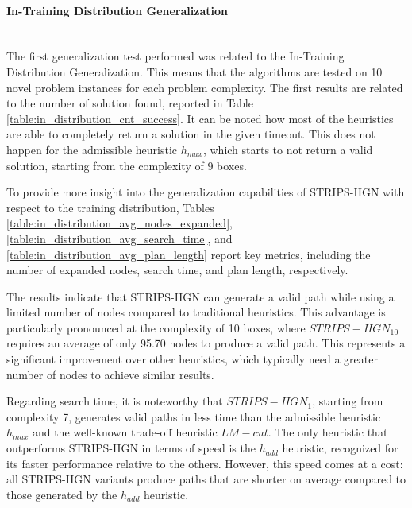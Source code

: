 \paragraph*{In-Training Distribution Generalization}\mbox{}\\
The first generalization test performed was related to the In-Training Distribution Generalization. This means that the algorithms are tested on 10 novel problem instances for each problem complexity.
The first results are related to the number of solution found, reported in Table \ref{table:in_distribution_cnt_success}. It can be noted how most of the heuristics are able to completely return a solution in the given timeout. This does not happen for the admissible heuristic $h_{max}$, which starts to not return a valid solution, starting from the complexity of 9 boxes. 



To provide more insight into the generalization capabilities of STRIPS-HGN with respect to the training distribution, Tables \ref{table:in_distribution_avg_nodes_expanded}, \ref{table:in_distribution_avg_search_time}, and \ref{table:in_distribution_avg_plan_length} report key metrics, including the number of expanded nodes, search time, and plan length, respectively.





The results indicate that STRIPS-HGN can generate a valid path while using a limited number of nodes compared to traditional heuristics. This advantage is particularly pronounced at the complexity of 10 boxes, where $STRIPS-HGN_{10}$ requires an average of only 95.70 nodes to produce a valid path. This represents a significant improvement over other heuristics, which typically need a greater number of nodes to achieve similar results.

Regarding search time, it is noteworthy that $STRIPS-HGN_1$, starting from complexity 7, generates valid paths in less time than the admissible heuristic $h_{max}$ and the well-known trade-off heuristic $LM-cut$. The only heuristic that outperforms STRIPS-HGN in terms of speed is the $h_{add}$ heuristic, recognized for its faster performance relative to the others. However, this speed comes at a cost: all STRIPS-HGN variants produce paths that are shorter on average compared to those generated by the $h_{add}$ heuristic.


